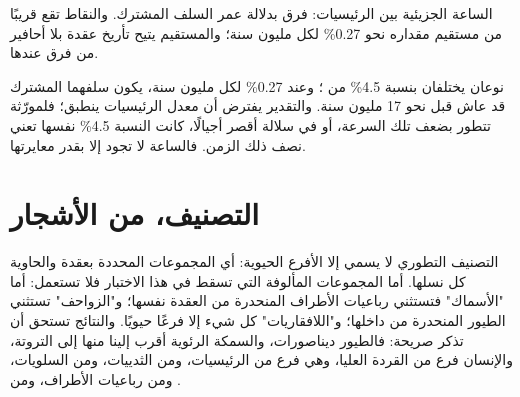 \begin{omfigure}

{\small الساعة الجزيئية بين الرئيسيات: فرق  بدلالة عمر السلف
المشترك. والنقاط تقع قريبًا من مستقيم مقداره نحو 0.27\% لكل مليون سنة؛
والمستقيم يتيح تأريخ عقدة بلا أحافير من فرق  عندها.}
\end{omfigure}

\begin{example}\label{ex:g12:phylogenetic-trees:dating}
نوعان يختلفان بنسبة 4.5\% من ؛ وعند 0.27\% لكل مليون سنة، يكون
سلفهما المشترك قد عاش قبل نحو 17 مليون سنة. والتقدير يفترض أن معدل
الرئيسيات ينطبق؛ فلمورّثة تتطور بضعف تلك السرعة، أو في سلالة أقصر
أجيالًا، كانت النسبة 4.5\% نفسها تعني نصف ذلك الزمن. فالساعة لا تجود
إلا بقدر معايرتها.
\end{example}

\section{التصنيف، من الأشجار}

\begin{proposition}\label{prop:g12:phylogenetic-trees:classification}
التصنيف التطوري لا يسمي إلا الأفرع الحيوية: أي المجموعات المحددة بعقدة
والحاوية كل نسلها. أما المجموعات المألوفة التي تسقط في هذا الاختبار
فلا تستعمل: أما "الأسماك" فتستثني رباعيات الأطراف المنحدرة من العقدة
نفسها؛ و"الزواحف" تستثني الطيور المنحدرة من داخلها؛ و"اللافقاريات" كل
شيء إلا فرعًا حيويًا. والنتائج تستحق أن تذكر صريحة: فالطيور ديناصورات،
والسمكة الرئوية أقرب إلينا منها إلى التروتة، والإنسان فرع من القردة
العليا، وهي فرع من الرئيسيات، ومن الثدييات، ومن السلويات، ومن رباعيات
الأطراف، ومن .
\end{proposition}
\admitted

